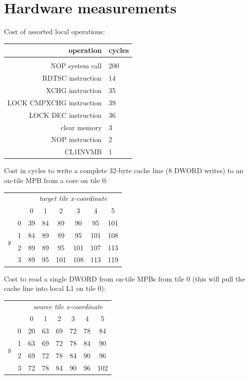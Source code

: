 \documentclass[a4paper,twoside]{report} %
\begin{document}
\chapter{Hardware measurements}\label{chap:bench}

Cost of assorted local operations: 

\begin{center}
\begin{tabular}{rl}
operation & cycles \\
\hline \\
NOP system call & 200 \\
RDTSC instruction & 14 \\
XCHG instruction & 35 \\
LOCK CMPXCHG instruction & 39 \\
LOCK DEC instruction & 36 \\
clear memory & 3 \\
NOP instruction & 2 \\
CL1INVMB & 1 \\
\end{tabular}
\end{center}

Cost in cycles to write a complete 32-byte cache line (8 DWORD writes)
to an on-tile MPB from a core on tile 0:

\begin{center}
\begin{tabular}{cc|cccccc}
&  &\multicolumn{6}{c}{\textit{target tile x-coordinate}} \\
 &   & 0   & 1   & 2   & 3   & 4   & 5 \\ \hline 
\multirow{4}{*}{\textit{y}} & 0 & 39  & 84  & 89  & 90  & 95  & 101 \\
 & 1 & 84  & 89  & 89  & 95  & 101 & 108 \\
 & 2 & 89  & 89  & 95 & 101 & 107 & 113 \\
 & 3 & 89  & 95  & 101 & 108 & 113 & 119 \\
\end{tabular}
\end{center}

Cost to read a single DWORD from on-tile MPBs from tile 0 (this will
pull the cache line into local L1 on tile 0):

\begin{center}
\begin{tabular}{cc|cccccc}
&  &\multicolumn{6}{c}{\textit{source tile x-coordinate}} \\
 &   & 0   & 1   & 2   & 3   & 4   & 5 \\ \hline 
\multirow{4}{*}{\textit{y}} & 0 & 20  & 63  & 69  & 72  & 78  & 84 \\
 & 1 & 63  & 69  & 72  & 78  & 84  & 90 \\
 & 2 & 69  & 72  & 78  & 84  & 90  & 96 \\
 & 3 & 72  & 78  & 84  & 90  & 96  & 102 \\
\end{tabular}
\end{center}
\end{document}
